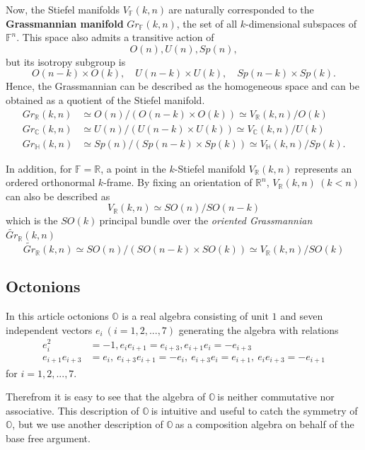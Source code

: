 \documentclass[a4paper]{article}%
\begin{document}
Now, the Stiefel manifolds $V_{\mathbb{F}}(k,n)\ $are naturally corresponded
to the \textbf{Grassmannian manifold} $Gr_{\mathbb{F}}(k,n)$, the set of all
$k$-dimensional subspaces of $\mathbb{F}^{n}$. This space also admits a
transitive action of
\[
O(n),U(n),Sp(n),
\]
but its isotropy subgroup is
\[
O(n-k)\times O(k),\quad U(n-k)\times U(k),\quad Sp(n-k)\times Sp(k).
\]
Hence, the Grassmannian can be described as the homogeneous space and can be
obtained as a quotient of the Stiefel manifold.%
\begin{align*}
Gr_{\mathbb{R}}(k,n)  &  \simeq O(n)/\left(  O(n-k)\times O(k)\right)  \simeq
V_{\mathbb{R}}(k,n)/O(k)\\
Gr_{\mathbb{C}}(k,n)  &  \simeq U(n)/\left(  U(n-k)\times U(k)\right)  \simeq
V_{\mathbb{C}}(k,n)/U(k)\\
Gr_{\mathbb{H}}(k,n)  &  \simeq Sp(n)/\left(  Sp(n-k)\times Sp(k)\right)
\simeq V_{\mathbb{H}}(k,n)/Sp(k).
\end{align*}


In addition, for $\mathbb{F}=\mathbb{R}$, a point in the $k$-Stiefel manifold
$V_{\mathbb{R}}(k,n)\ $represents an ordered orthonormal $k$-frame. By fixing
an orientation of $\mathbb{R}^{n}$, $V_{\mathbb{R}}(k,n)\ (k<n)\ $can also be
described as
\[
V_{\mathbb{R}}(k,n)\simeq SO(n)/SO(n-k)
\]
which is the $SO(k)\ $principal bundle over the \textit{oriented Grassmannian}
$\widetilde{Gr}_{\mathbb{R}}(k,n)$
\[
\widetilde{Gr}_{\mathbb{R}}(k,n)\simeq SO(n)/\left(  SO(n-k)\times
SO(k)\right)  \simeq V_{\mathbb{R}}(k,n)/SO(k)
\]


\subsection{\label{SubsectionOct}Octonions}

In this article octonions $\mathbb{O}$ is a real algebra consisting of unit
$1$ and seven independent vectors $e_{i}\ \left(  i=1,2,...,7\right)  $
generating the algebra with relations
\begin{align*}
e_{i}^{2}  &  =-1,e_{i}e_{i+1}=e_{i+3},e_{i+1}e_{i}=-e_{i+3}\\
e_{i+1}e_{i+3}  &  =e_{i},\ e_{i+3}e_{i+1}=-e_{i},\ e_{i+3}e_{i}%
=e_{i+1},\ e_{i}e_{i+3}=-e_{i+1}%
\end{align*}
for $i=1,2,...,7$.

Therefrom it is easy to see that the algebra of $\mathbb{O\ }$is neither
commutative nor associative. This description of $\mathbb{O\ }$is intuitive
and useful to catch the symmetry of $\mathbb{O}$, but we use another
description of $\mathbb{O\ }$as a composition algebra on behalf of the base
free argument.
\end{document}
